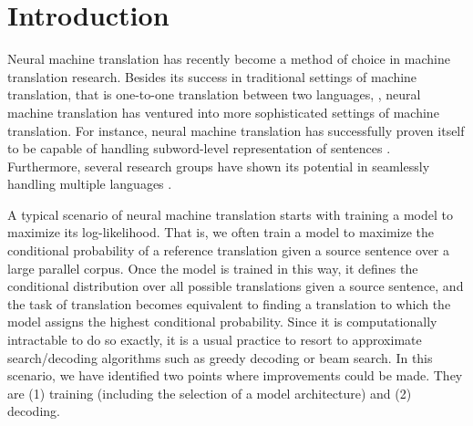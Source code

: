 \section{Introduction}
\label{sec:introduction}

Neural machine translation has recently become a method of choice in machine translation research. Besides its success in traditional settings of machine translation, that is one-to-one translation between two languages, \citep{sennrich2016edinburgh,chung2016nyu}, neural machine translation has ventured into more sophisticated settings of machine translation. For instance, neural machine translation has successfully proven itself to be capable of handling subword-level representation of sentences \citep{lee2016fully,luong2016achieving,sennrich2015neural,costa2016character,ling2015character}. Furthermore, several research groups have shown its potential in seamlessly handling multiple languages \citep{dong2015multi,luong2015multi,firat2016multi,firat2016zero,lee2016fully,ha2016toward,viegas2016google}. 

A typical scenario of neural machine translation starts with training a model to maximize its log-likelihood. That is, we often train a model to maximize the conditional probability of a reference translation given a source sentence over a large parallel corpus. Once the model is trained in this way, it defines the conditional distribution over all possible translations given a source sentence, and the task of translation becomes equivalent to finding a translation to which the model assigns the highest conditional probability. Since it is computationally intractable to do so exactly, it is a usual practice to resort to approximate search/decoding algorithms such as greedy decoding or beam search. In this scenario, we have identified two points where improvements could be made. They are (1) training (including the selection of a model architecture) and (2) decoding.


